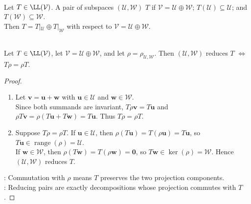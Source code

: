 \begin{definition} \label{def:reducing-pair-and-direct-sum-operator} \\
Let $T\in\LL(\mathcal{V})$. A pair of subspaces $(\mathcal{U},\mathcal{W})$  $T$ if $\mathcal{V}=\mathcal{U}\oplus\mathcal{W}$; $T(\mathcal{U})\subseteq\mathcal{U}$; and $T(\mathcal{W})\subseteq\mathcal{W}$.\\
Then $T=T|_{\mathcal{U}}\oplus T|_{\mathcal{W}}$ with respect to $\mathcal{V}=\mathcal{U}\oplus\mathcal{W}$.
\end{definition}

\begin{proposition} \label{prop:reducing-pairs-and-algebraic-projections} \\
Let $T\in\LL(\mathcal{V})$, let $\mathcal{V}=\mathcal{U}\oplus\mathcal{W}$, and let $\rho=\rho_{\mathcal{U},\mathcal{W}}$. Then $(\mathcal{U},\mathcal{W})$ reduces $T$ $\Longleftrightarrow$ $T\rho=\rho T$.
\begin{proof}
\begin{enumerate}[label=\roman*.]
\setlength{\itemsep}{0pt}
\item[$(\Rightarrow)$] Let $\mathbf{v}=\mathbf{u}+\mathbf{w}$ with $\mathbf{u}\in\mathcal{U}$ and $\mathbf{w}\in\mathcal{W}$.\\
Since both summands are invariant, $T\rho\mathbf{v}=T\mathbf{u}$ and $\rho T\mathbf{v}=\rho(T\mathbf{u}+T\mathbf{w})=T\mathbf{u}$. Thus $T\rho=\rho T$.
\item[$(\Leftarrow)$] Suppose $T\rho=\rho T$. If $\mathbf{u}\in\mathcal{U}$, then $\rho(T\mathbf{u})=T(\rho\mathbf{u})=T\mathbf{u}$, so $T\mathbf{u}\in\operatorname{range}(\rho)=\mathcal{U}$.\\
If $\mathbf{w}\in\mathcal{W}$, then $\rho(T\mathbf{w})=T(\rho\mathbf{w})=\mathbf{0}$, so $T\mathbf{w}\in\ker(\rho)=\mathcal{W}$. Hence $(\mathcal{U},\mathcal{W})$ reduces $T$.
\end{enumerate}
: Commutation with $\rho$ means $T$ preserves the two projection components.\\
: Reducing pairs are exactly decompositions whose projection commutes with $T$.
\end{proof}
\end{proposition}

